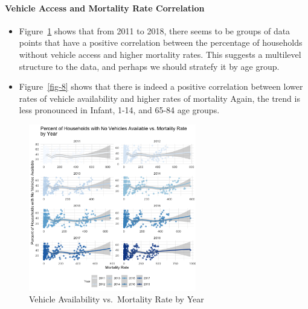 \documentclass[
  letterpaper,
  DIV=11,
  numbers=noendperiod]{scrartcl}
\let\oldparagraph\paragraph
\renewcommand{\paragraph}[1]{\oldparagraph{#1}\mbox{}}
\begin{document}
\hypertarget{vehicle-access-and-mortality-rate-correlation}{%
\paragraph{Vehicle Access and Mortality Rate
Correlation}\label{vehicle-access-and-mortality-rate-correlation}}

\begin{itemize}
\item
  Figure~\ref{fig-7} shows that from 2011 to 2018, there seems to be
  groups of data points that have a positive correlation between the
  percentage of households without vehicle access and higher mortality
  rates. This suggests a multilevel structure to the data, and perhaps
  we should stratefy it by age group.
\item
  Figure~\ref{fig-8} shows that there is indeed a positive correlation
  between lower rates of vehicle availability and higher rates of
  mortality Again, the trend is less pronounced in Infant, 1-14, and
  65-84 age groups.
\end{itemize}

\begin{figure}

{\centering \includegraphics[width=0.65\textwidth,height=\textheight]{figures/novhcl_vs_mortality_by_year.png}

}

\caption{\label{fig-7}Vehicle Availability vs.~Mortality Rate by Year}

\end{figure}
\end{document}
